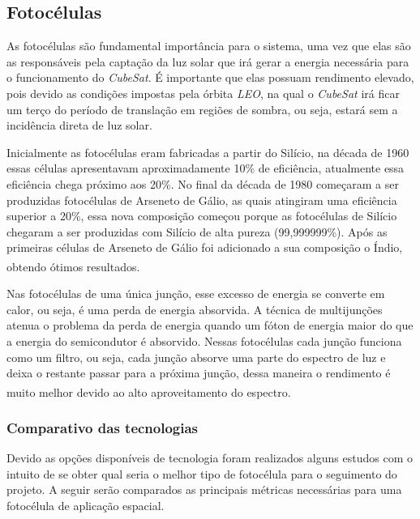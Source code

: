 \documentclass[
	12pt,				%
	openright,			%
	oneside,			%
	a4paper,			%
	english,			%
	french,				%
	spanish,			%
	brazil,				%
	oldfontcommands
	]{abntex2}
\begin{document}
\subsection[Fotocélulas]{Fotocélulas}

	As fotocélulas são fundamental importância para o sistema, uma vez que elas são as responsáveis pela captação da luz solar que irá gerar a energia necessária para o funcionamento do \textit{CubeSat}. É importante que elas possuam rendimento elevado, pois devido as condições impostas pela órbita \textit{LEO}, na qual o \textit{CubeSat} irá ficar um terço do período de translação em regiões de sombra, ou seja, estará sem a incidência direta de luz solar.
	
	Inicialmente as fotocélulas eram fabricadas a partir do Silício, na década de 1960 essas células apresentavam aproximadamente 10\% de eficiência, atualmente essa eficiência chega próximo aos 20\%. No final da década de 1980 começaram a ser produzidas fotocélulas de Arseneto de Gálio, as quais atingiram uma eficiência superior a 20\%, essa nova composição começou porque as fotocélulas de Silício chegaram a ser produzidas com Silício de alta pureza (99,999999\%). Após as primeiras células de Arseneto de Gálio foi adicionado a sua composição o Índio, obtendo ótimos resultados.\textsuperscript{\cite{Fatemi}}
	
	Nas fotocélulas de uma única junção, esse excesso de energia se converte em calor, ou seja, é uma perda de energia absorvida. A técnica de multijunções atenua o problema da perda de energia quando um fóton de energia maior do que a energia do semicondutor é absorvido. Nessas fotocélulas cada junção funciona como um filtro, ou seja, cada junção absorve uma parte do espectro de luz e deixa o restante passar para a próxima junção, dessa maneira o rendimento é muito melhor devido ao alto aproveitamento do espectro.\textsuperscript{\cite{Fatemi}}
	
\subsubsection[Comparativo das tecnologias]{Comparativo das tecnologias}

	Devido as opções disponíveis de tecnologia foram realizados alguns estudos com o intuito de se obter qual seria o melhor tipo de fotocélula para o seguimento do projeto. A seguir serão comparados as principais métricas necessárias para uma fotocélula de aplicação espacial.
	
\end{document}
